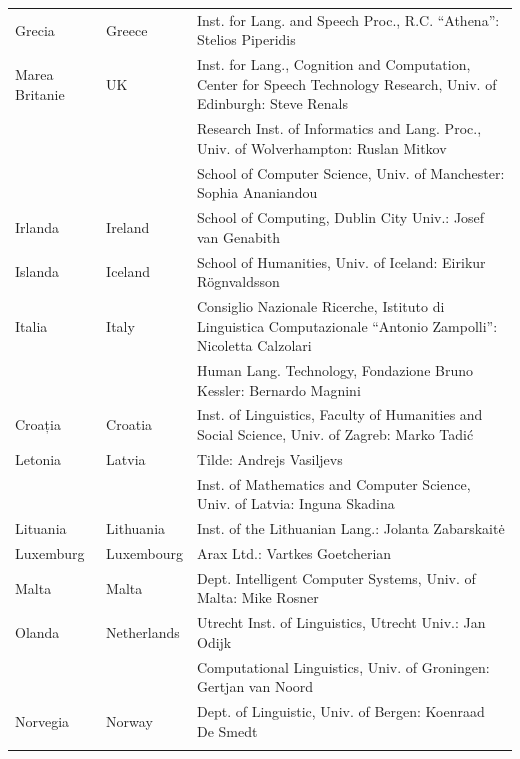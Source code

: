 \documentclass[]{../../metanetpaper}
\begin{document}
\begin{longtable}{llp{105mm}}
  Grecia & \textcolor{grey1}{Greece} & Inst. for Lang. and Speech Proc., R.C. “Athena”: Stelios Piperidis\\ \addlinespace
  Marea Britanie & \textcolor{grey1}{UK} & Inst. for Lang., Cognition and Computation, Center for Speech Technology Research, Univ. of Edinburgh: Steve Renals \\ \addlinespace 
  & & Research Inst. of Informatics and Lang. Proc., Univ. of Wolverhampton: Ruslan Mitkov \\ \addlinespace 
  & & School of Computer Science, Univ. of Manchester: Sophia Ananiandou \\ \addlinespace 
  Irlanda & \textcolor{grey1}{Ireland} & School of Computing, Dublin City Univ.: Josef van Genabith\\ \addlinespace
  Islanda & \textcolor{grey1}{Iceland} & School of Humanities, Univ. of Iceland: Eirikur Rögnvaldsson\\ \addlinespace
  Italia & \textcolor{grey1}{Italy} & Consiglio Nazionale Ricerche, Istituto di Linguistica Computazionale “Antonio Zampolli”: Nicoletta Calzolari\\ \addlinespace
  & & Human Lang. Technology, Fondazione Bruno Kessler: Bernardo Magnini\\ \addlinespace 
  Croația & \textcolor{grey1}{Croatia} & Inst. of Linguistics, Faculty of Humanities and Social Science, Univ. of Zagreb: Marko Tadić \\ \addlinespace
  Letonia & \textcolor{grey1}{Latvia} & Tilde: Andrejs Vasiljevs\\ \addlinespace 
  & & Inst. of Mathematics and Computer Science, Univ. of Latvia: Inguna Skadina\\ \addlinespace
  Lituania & \textcolor{grey1}{Lithuania} & Inst. of the Lithuanian Lang.: Jolanta Zabarskaitė\\ \addlinespace
  Luxemburg & \textcolor{grey1}{Luxembourg} & Arax Ltd.: Vartkes Goetcherian\\ \addlinespace
  Malta & \textcolor{grey1}{Malta} & Dept. Intelligent Computer Systems, Univ. of Malta: Mike Rosner\\ \addlinespace
  Olanda & \textcolor{grey1}{Netherlands} & Utrecht Inst. of Linguistics, Utrecht Univ.: Jan Odijk\\ \addlinespace 
  & & Computational Linguistics, Univ. of Groningen: Gertjan van Noord\\ \addlinespace
  Norvegia & \textcolor{grey1}{Norway} & Dept. of Linguistic, Univ. of Bergen: Koenraad De Smedt\\ \addlinespace 

\end{longtable}
\end{document}
